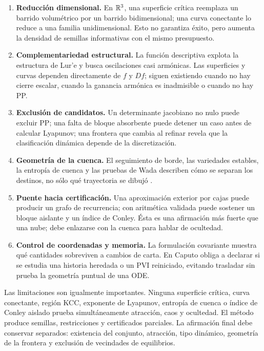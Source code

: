 \begin{enumerate}
 \item \textbf{Reducción dimensional.} En $\mathbb{R}^3$, una superficie crítica
 reemplaza un barrido volumétrico por un barrido bidimensional; una curva
 conectante lo reduce a una familia unidimensional. Esto no garantiza éxito,
 pero aumenta la densidad de semillas informativas con el mismo presupuesto.
 \item \textbf{Complementariedad estructural.} La función descriptiva explota
 la estructura de Lur'e y busca oscilaciones casi armónicas. Las superficies y
 curvas dependen directamente de $f$ y $Df$; siguen existiendo cuando no hay
 cierre escalar, cuando la ganancia armónica es inadmisible o cuando no hay PP.
 \item \textbf{Exclusión de candidatos.} Un determinante jacobiano no nulo puede
 excluir PP; una falta de bloque absorbente puede detener un caso antes de
 calcular Lyapunov; una frontera que cambia al refinar revela que la
 clasificación dinámica depende de la discretización.
 \item \textbf{Geometría de la cuenca.} El seguimiento de borde, las variedades
 estables, la entropía de cuenca y las pruebas de Wada describen cómo se
 separan los destinos, no sólo qué trayectoria se dibujó
 \cite{DazaEtAl2016BasinEntropy,DazaEtAl2015Wada}.
 \item \textbf{Puente hacia certificación.} Una aproximación exterior por
 cajas puede producir un grafo de recurrencia; con aritmética validada puede
 sostener un bloque aislante y un índice de Conley. Ésta es una afirmación más
 fuerte que una nube; debe enlazarse con la cuenca para hablar
 de ocultedad.
 \item \textbf{Control de coordenadas y memoria.} La formulación covariante
 muestra qué cantidades sobreviven a cambios de carta. En Caputo obliga a
 declarar si se estudia una historia heredada o un PVI reiniciado, evitando
 trasladar sin prueba la geometría puntual de una ODE.
\end{enumerate}

Las limitaciones son igualmente importantes. Ninguna superficie crítica,
curva conectante, región KCC, exponente de Lyapunov, entropía de cuenca o índice
de Conley aislado prueba simultáneamente atracción, caos y ocultedad. El método
produce semillas, restricciones y certificados parciales. La afirmación final
debe conservar separados: existencia del conjunto, atracción, tipo dinámico,
geometría de la frontera y exclusión de vecindades de equilibrios.

